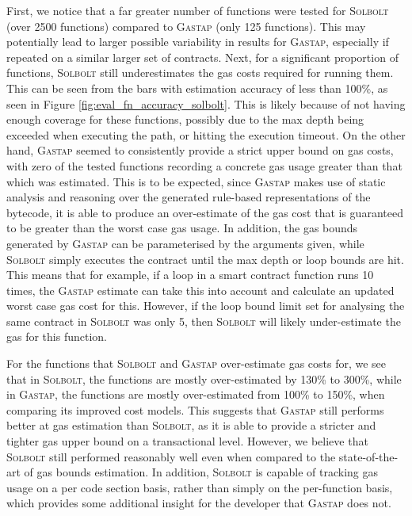 First, we notice that a far greater number of functions were tested for \textcolor{NavyBlue}{\textsc{Solbolt}} (over 2500 functions) compared to
\textsc{Gastap} (only 125 functions). This may potentially lead to larger possible variability in results for \textsc{Gastap}, especially
if repeated on a similar larger set of contracts.
Next, for a significant proportion of functions, \textcolor{NavyBlue}{\textsc{Solbolt}} still underestimates the 
gas costs required for running them. This can be seen from the bars with estimation accuracy of less
than 100\%, as seen in Figure \ref{fig:eval_fn_accuracy_solbolt}. This is likely because of not having enough coverage
for these functions, possibly due to the max depth being exceeded when executing the path, or hitting the execution timeout.
On the other hand,
\textsc{Gastap} seemed to consistently provide a strict upper bound on gas costs, with zero of the tested functions
recording a concrete gas usage greater than that which was estimated. This is to be expected,
since \textsc{Gastap} makes use of static analysis and reasoning over the generated rule-based representations 
of the bytecode, it is able to produce an over-estimate of the gas cost that is guaranteed to be greater
than the worst case gas usage. In addition, the gas bounds generated by \textsc{Gastap} can be parameterised
by the arguments given, while \textcolor{NavyBlue}{\textsc{Solbolt}} simply executes the contract until the max depth or loop bounds are hit.
This means that for example, if a loop in a smart contract function runs 10 times, the \textsc{Gastap} estimate can take this
into account and calculate an updated worst case gas cost for this. However, if the loop bound limit set for
analysing the same contract in \textcolor{NavyBlue}{\textsc{Solbolt}} was only 5, then \textcolor{NavyBlue}{\textsc{Solbolt}} will likely under-estimate the gas for this function.

For the functions that \textcolor{NavyBlue}{\textsc{Solbolt}} and \textsc{Gastap} over-estimate gas costs for, we see that in \textcolor{NavyBlue}{\textsc{Solbolt}},
the functions are mostly over-estimated by 130\% to 300\%, while in \textsc{Gastap}, the functions
are mostly over-estimated from 100\% to 150\%, when comparing its improved cost models. 
This suggests that \textsc{Gastap} still performs better
at gas estimation than \textcolor{NavyBlue}{\textsc{Solbolt}}, as it is able to provide a stricter and tighter gas upper bound
on a transactional level. However, we believe that \textcolor{NavyBlue}{\textsc{Solbolt}} still performed reasonably well
even when compared to the state-of-the-art of gas bounds estimation. In addition,
\textcolor{NavyBlue}{\textsc{Solbolt}} is capable of tracking gas usage on a per code section basis, rather than simply
on the per-function basis, which provides some additional insight for the developer that \textsc{Gastap}
does not.

